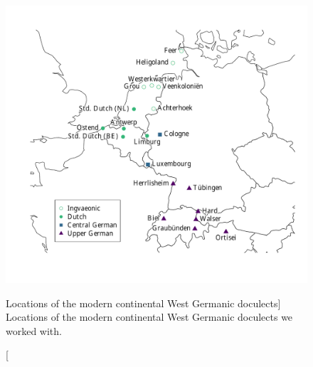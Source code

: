 \documentclass[a4paper, 11pt]{article}
\begin{document}
\begin{figure}[h]
\centering
\includegraphics[width=\textwidth]{figures/map.pdf}
\caption
[Locations of the modern continental West Germanic doculects]
{Locations of the modern continental West Germanic doculects we worked with.}
\label{fig:map}
\end{figure}
\end{document}

